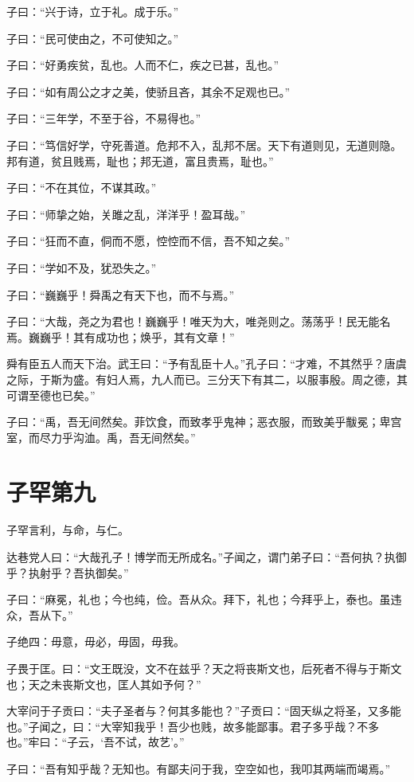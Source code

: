 \documentclass[twoside,openany]{book}
\begin{document}
子曰：“兴于诗，立于礼。成于乐。”

子曰：“民可使由之，不可使知之。”

子曰：“好勇疾贫，乱也。人而不仁，疾之已甚，乱也。”

子曰：“如有周公之才之美，使骄且吝，其余不足观也已。”

子曰：“三年学，不至于谷，不易得也。”

子曰：“笃信好学，守死善道。危邦不入，乱邦不居。天下有道则见，无道则隐。邦有道，贫且贱焉，耻也；邦无道，富且贵焉，耻也。”

子曰：“不在其位，不谋其政。”

子曰：“师挚之始，关雎之乱，洋洋乎！盈耳哉。”

子曰：“狂而不直，侗而不愿，悾悾而不信，吾不知之矣。”

子曰：“学如不及，犹恐失之。”

子曰：“巍巍乎！舜禹之有天下也，而不与焉。”

子曰：“大哉，尧之为君也！巍巍乎！唯天为大，唯尧则之。荡荡乎！民无能名焉。巍巍乎！其有成功也；焕乎，其有文章！”

舜有臣五人而天下治。武王曰：“予有乱臣十人。”孔子曰：“才难，不其然乎？唐虞之际，于斯为盛。有妇人焉，九人而已。三分天下有其二，以服事殷。周之德，其可谓至德也已矣。”

子曰：“禹，吾无间然矣。菲饮食，而致孝乎鬼神；恶衣服，而致美乎黻冕；卑宫室，而尽力乎沟洫。禹，吾无间然矣。” 

\chapter{子罕第九}\label{ch9}

子罕言利，与命，与仁。

达巷党人曰：“大哉孔子！博学而无所成名。”子闻之，谓门弟子曰：“吾何执？执御乎？执射乎？吾执御矣。”

子曰：“麻冕，礼也；今也纯，俭。吾从众。拜下，礼也；今拜乎上，泰也。虽违众，吾从下。”

子绝四：毋意，毋必，毋固，毋我。

子畏于匡。曰：“文王既没，文不在兹乎？天之将丧斯文也，后死者不得与于斯文也；天之未丧斯文也，匡人其如予何？”

大宰问于子贡曰：“夫子圣者与？何其多能也？”子贡曰：“固天纵之将圣，又多能也。”子闻之，曰：“大宰知我乎！吾少也贱，故多能鄙事。君子多乎哉？不多也。”牢曰：“子云，‘吾不试，故艺’。”

子曰：“吾有知乎哉？无知也。有鄙夫问于我，空空如也，我叩其两端而竭焉。”
\end{document}
